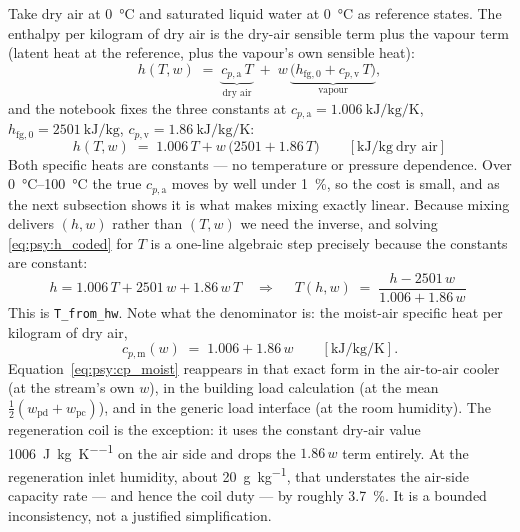 Take dry air at \SI{0}{\celsius} and saturated liquid water at \SI{0}{\celsius} as reference states.
The enthalpy per kilogram of dry air is the dry-air sensible term plus the vapour term (latent heat
at the reference, plus the vapour's own sensible heat):
\begin{equation}
h(T,w) \;=\; \underbrace{c_{p,\mathrm{a}}\,T}_{\text{dry air}}
\;+\; w\,\underbrace{\bigl(h_{\mathrm{fg},0} + c_{p,\mathrm{v}}\,T\bigr)}_{\text{vapour}} ,
\label{eq:psy:h_general}
\end{equation}
and the notebook fixes the three constants at $c_{p,\mathrm{a}} =
\SI{1.006}{\kilo\joule\per\kilogram\per\kelvin}$, $h_{\mathrm{fg},0} =
\SI{2501}{\kilo\joule\per\kilogram}$, $c_{p,\mathrm{v}} =
\SI{1.86}{\kilo\joule\per\kilogram\per\kelvin}$:
\begin{equation}
\boxed{\;h(T,w) \;=\; 1.006\,T + w\,\bigl(2501 + 1.86\,T\bigr)
\qquad [\si{\kilo\joule\per\kilogram}\ \text{dry air}]\;} \label{eq:psy:h_coded}
\end{equation}
Both specific heats are constants --- no temperature or pressure dependence. Over
\SIrange{0}{100}{\celsius} the true $c_{p,\mathrm{a}}$ moves by well under \SI{1}{\percent}, so the
cost is small, and as the next subsection shows it is what makes mixing exactly linear. Because
mixing delivers $(h,w)$ rather than $(T,w)$ we need the inverse, and solving \eqref{eq:psy:h_coded}
for $T$ is a one-line algebraic step precisely because the constants are constant:
\begin{equation}
h = 1.006\,T + 2501\,w + 1.86\,w\,T \quad\Longrightarrow\quad
\boxed{\;T(h,w) \;=\; \frac{h - 2501\,w}{1.006 + 1.86\,w}\;} \label{eq:psy:T_from_hw}
\end{equation}
This is \texttt{T\_from\_hw}. Note what the denominator is: the moist-air specific heat per kilogram
of dry air,
\begin{equation}
c_{p,\mathrm{m}}(w) \;=\; 1.006 + 1.86\,w \qquad [\si{\kilo\joule\per\kilogram\per\kelvin}] .
\label{eq:psy:cp_moist}
\end{equation}
Equation~\eqref{eq:psy:cp_moist} reappears in that exact form in the air-to-air cooler (at the
stream's own $w$), in the building load calculation (at the mean $\tfrac12(w_{\mathrm{pd}} +
w_{\mathrm{pc}})$), and in the generic load interface (at the room humidity). The regeneration coil
is the exception: it uses the constant dry-air value \SI{1006}{\joule\per\kilogram\per\kelvin} on
the air side and drops the $1.86\,w$ term entirely. At the regeneration inlet humidity, about
\SI{20}{\gram\per\kilogram}, that understates the air-side capacity rate --- and hence the coil duty
--- by roughly \SI{3.7}{\percent}. It is a bounded inconsistency, not a justified simplification.

